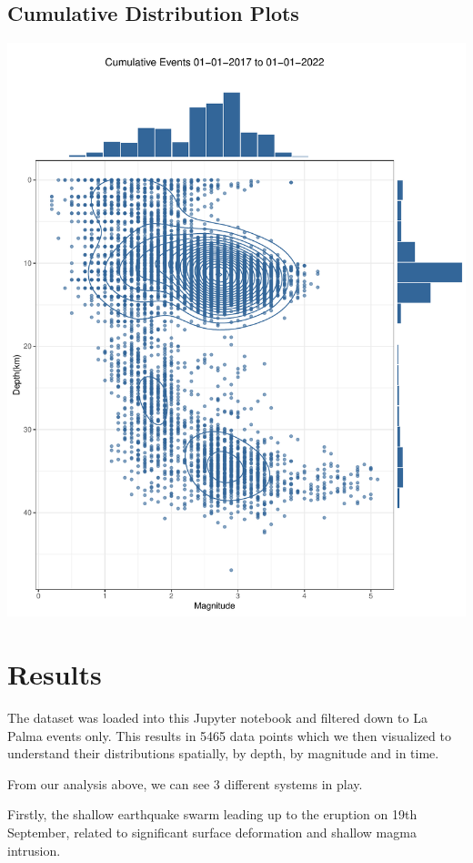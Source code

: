 \documentclass[
]{agujournal2019}
\begin{document}
\subsection{Cumulative Distribution
Plots}\label{cumulative-distribution-plots}

\includegraphics{index_files/figure-pdf/plot-dists-1.pdf}

\section{Results}\label{results}

The dataset was loaded into this Jupyter notebook and filtered down to
La Palma events only. This results in 5465 data points which we then
visualized to understand their distributions spatially, by depth, by
magnitude and in time.

From our analysis above, we can see 3 different systems in play.

Firstly, the shallow earthquake swarm leading up to the eruption on 19th
September, related to significant surface deformation and shallow magma
intrusion.
\end{document}
